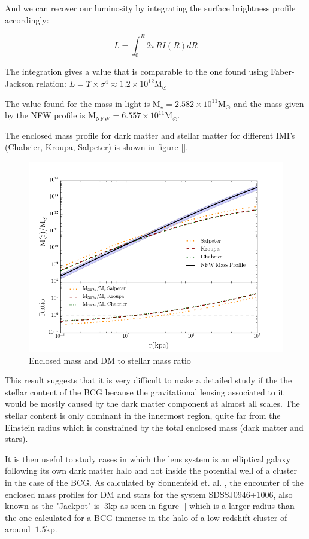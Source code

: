 And we can recover our luminosity by integrating the surface brightness profile accordingly:

\begin{equation}
L=\int_{0}^{R}2\pi RI(R)dR
\end{equation}

The integration gives a value that is comparable to the one found using Faber-Jackson relation: $L=\Upsilon\times\sigma^{4}\approx 1.2\times 10^{12}\text{M}_{\odot}$

The value found for the mass in light is $\text{M}_{\star}=2.582\times 10^{11}\text{M}_{\odot}$ and the mass given by the NFW profile is $\text{M}_{\text{NFW}}=6.557\times 10^{11}\text{M}_{\odot}$.

The enclosed mass profile for dark matter and stellar matter for different IMFs (Chabrier, Kroupa, Salpeter) is shown in figure [].

\begin{figure}[H]
\centering
\includegraphics[width=12cm]{images/DM_fraction_all_IMFs.png}
\caption[Enclosed mass and DM to stellar mass ratio]{Enclosed mass and DM to stellar mass ratio}
\end{figure}

This result suggests that it is very difficult to make a detailed study if the the stellar content of the BCG because the gravitational lensing associated to it would be mostly caused by the dark matter component at almost all scales. The stellar content is only dominant in the innermost region, quite far from the Einstein radius which is constrained by the total enclosed mass (dark matter and stars).

It is then useful to study cases in which the lens system is an elliptical galaxy following its own dark matter halo and not inside the potential well of a cluster in the case of the BCG. As calculated by Sonnenfeld et. al. \citeyear{Reference15}, the encounter of the enclosed mass profiles for DM and stars for the system SDSSJ0946+1006, also known as the "Jackpot" is $~3\text{kp}$ as seen in figure [] which is a larger radius than the one calculated for a BCG immerse in the halo of a low redshift cluster of around $~1.5\text{kp}$.  

